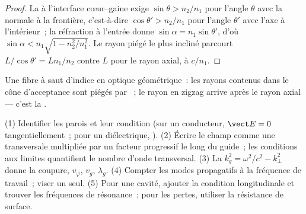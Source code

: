 \begin{proof}
La  à l'interface cœur--gaine exige $\sin\theta >
n_2/n_1$ pour l'angle $\theta$ avec la normale à la frontière, c'est-à-dire $\cos
\theta' > n_2/n_1$ pour l'angle $\theta'$ avec l'axe à l'intérieur~; la réfraction
à l'entrée donne $\sin\alpha = n_1\sin\theta'$, d'où $\sin\alpha < n_1\sqrt{1
- n_2^2/n_1^2}$. Le rayon piégé le plus incliné parcourt $L/\cos\theta' = Ln_1/n_2$
contre $L$ pour le rayon axial, à $c/n_1$.
\end{proof}

\begin{omfigure}

{\small Une fibre à saut d'indice en optique géométrique~: les rayons contenus dans le
cône d'acceptance sont piégés par ~; le rayon en zigzag
arrive après le rayon axial --- c'est la .}
\end{omfigure}

\begin{method}\label{met:b2:guided-waves:method}
(1) Identifier les parois et leur condition (sur un conducteur, $\vect E = 0$
tangentiellement~; pour un diélectrique, ). (2) Écrire le champ
comme une  transversale multipliée par un facteur progressif le long du
guide~; les conditions aux limites quantifient le nombre d'onde transversal.
(3) La  $k_g^2 = \omega^2/c^2 - k_\perp^2$ donne la
coupure, $v_\varphi$, $v_g$, $\lambda_g$. (4) Compter les modes propagatifs à la
fréquence de travail~; viser un seul. (5) Pour une cavité, ajouter la condition
longitudinale et trouver les fréquences de résonance~; pour les pertes, utiliser la
résistance de surface.
\end{method}

